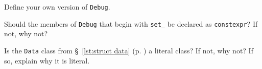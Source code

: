 %
%
\begin{question}
Define your own version of \verb|Debug|.
\end{question}

\begin{question}
Should the members of \verb|Debug| that begin with \verb|set_| be
declared as \verb|constexpr|? If not, why not?
\end{question}

\begin{question}
Is the \verb|Data| class from \S~\ref{lst:struct data} (p. \pageref{lst:struct data}) a literal class? If
not, why not? If so, explain why it is literal.
\end{question}
